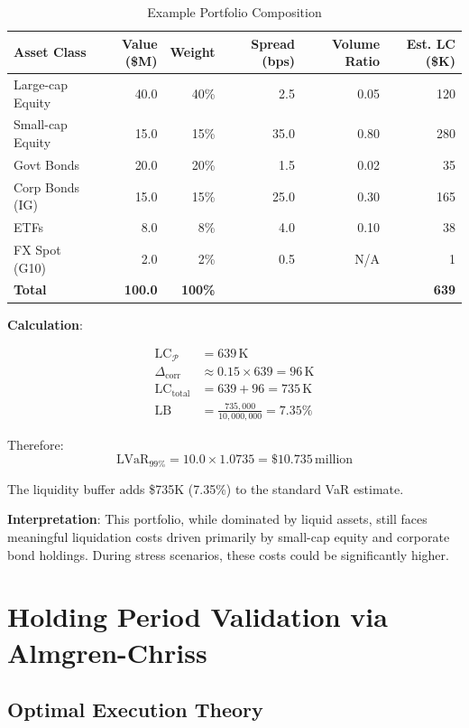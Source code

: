 \documentclass[11pt,a4paper]{article}
\begin{document}
\begin{table}[h]
\centering
\caption{Example Portfolio Composition}
\begin{tabular}{@{}lrrrrr@{}}
\toprule
Asset Class & Value (\$M) & Weight & Spread (bps) & Volume Ratio & Est. LC (\$K) \\
\midrule
Large-cap Equity & 40.0 & 40\% & 2.5 & 0.05 & 120 \\
Small-cap Equity & 15.0 & 15\% & 35.0 & 0.80 & 280 \\
Govt Bonds & 20.0 & 20\% & 1.5 & 0.02 & 35 \\
Corp Bonds (IG) & 15.0 & 15\% & 25.0 & 0.30 & 165 \\
ETFs & 8.0 & 8\% & 4.0 & 0.10 & 38 \\
FX Spot (G10) & 2.0 & 2\% & 0.5 & N/A & 1 \\
\midrule
\textbf{Total} & \textbf{100.0} & \textbf{100\%} & & & \textbf{639} \\
\bottomrule
\end{tabular}
\end{table}

\textbf{Calculation}:

\begin{align*}
\text{LC}_\mathcal{P} &= 639\,\text{K} \\
\Delta_{\text{corr}} &\approx 0.15 \times 639 = 96\,\text{K} \\
\text{LC}_{\text{total}} &= 639 + 96 = 735\,\text{K} \\
\text{LB} &= \frac{735,000}{10,000,000} = 7.35\%
\end{align*}

Therefore:
\begin{equation}
\text{LVaR}_{99\%} = 10.0 \times 1.0735 = \$10.735\,\text{million}
\end{equation}

The liquidity buffer adds \$735K (7.35\%) to the standard VaR estimate.

\textbf{Interpretation}: This portfolio, while dominated by liquid assets, still faces meaningful liquidation costs driven primarily by small-cap equity and corporate bond holdings. During stress scenarios, these costs could be significantly higher.

\section{Holding Period Validation via Almgren-Chriss}

\subsection{Optimal Execution Theory}
\end{document}
